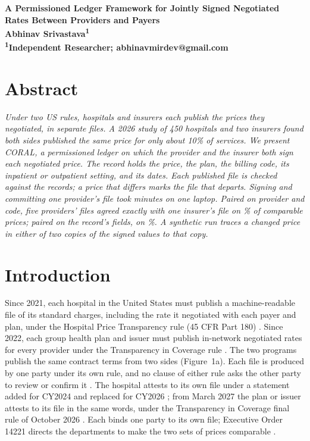 \documentclass[10pt]{article}
\begin{document}
\begin{center}
{\large\bfseries A Permissioned Ledger Framework for Jointly Signed Negotiated Rates Between Providers and Payers}\\[4pt]
{\bfseries Abhinav Srivastava\textsuperscript{1}}\\[2pt]
{\bfseries \textsuperscript{1}Independent Researcher; abhinavmirdev@gmail.com}
\end{center}

\section*{Abstract}
\textit{Under two US rules, hospitals and insurers each publish the prices they negotiated, in separate files. A 2026 study of 450 hospitals and two insurers found both sides published the same price for only about 10\% of services. We present CORAL, a permissioned ledger on which the provider and the insurer both sign each negotiated price. The record holds the price, the plan, the billing code, its inpatient or outpatient setting, and its dates. Each published file is checked against the records; a price that differs marks the file that departs. Signing and committing one provider's file took \sheetTotalMin{} minutes on one laptop. Paired on provider and code, five providers' files agreed exactly with one insurer's file on \coarseExact\% of comparable prices; paired on the record's fields, on \pairLineExact\%. A synthetic run traces a changed price in either of two copies of the signed values to that copy.}

\section*{Introduction}

Since 2021, each hospital in the United States must publish a machine-readable file of its standard charges, including the rate it negotiated with each payer and plan, under the Hospital Price Transparency rule (45 CFR Part 180) \cite{hpt}. Since 2022, each group health plan and issuer must publish in-network negotiated rates for every provider under the Transparency in Coverage rule \cite{tic}. The two programs publish the same contract terms from two sides (Figure~1a). Each file is produced by one party under its own rule, and no clause of either rule asks the other party to review or confirm it \cite{hpt,tic}. The hospital attests to its own file under a statement added for CY2024 and replaced for CY2026 \cite{opps2024,opps2026}; from March 2027 the plan or issuer attests to its file in the same words, under the Transparency in Coverage final rule of October 2026 \cite{tic2026}. Each binds one party to its own file; Executive Order 14221 directs the departments to make the two sets of prices comparable \cite{eo14221}.
\end{document}
